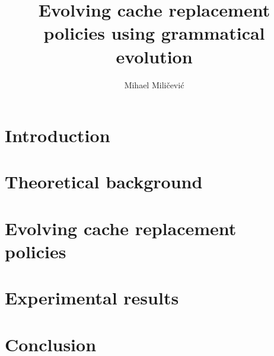 \documentclass[times, utf8, zavrsni]{fer}
\begin{document}

\title{Evolving cache replacement policies using grammatical evolution}

\author{Mihael Miličević}

\maketitle

\izvornik

\zahvala{}

\tableofcontents

\chapter{Introduction}



\chapter{Theoretical background}







\chapter{Evolving cache replacement policies}







\chapter{Experimental results}

\chapter{Conclusion}


\end{document}
